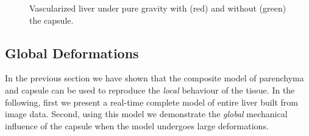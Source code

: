 \documentclass{llncs}
\begin{document}
\begin{figure}[t]
  \centering
  \caption{\label{f:global}Vascularized liver under pure gravity with (red) and without (green) the capsule.}
\end{figure}

\subsection{Global Deformations}
In the previous section we have shown that the composite model of parenchyma and 
capsule can be used to reproduce the \emph{local} behaviour of the tissue. In the following, 
first we present a real-time complete model of entire liver built from image data. 
Second, using this model we demonstrate the \emph{global} mechanical influence of the capsule when 
the model undergoes large deformations. 
\end{document}
